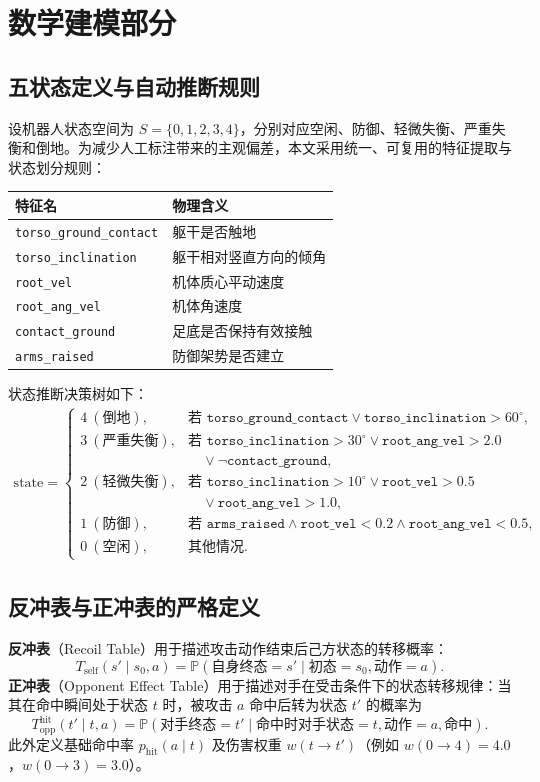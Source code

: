 \section{数学建模部分}
\subsection{五状态定义与自动推断规则}
设机器人状态空间为 $S=\{0,1,2,3,4\}$，分别对应空闲、防御、轻微失衡、严重失衡和倒地。为减少人工标注带来的主观偏差，本文采用统一、可复用的特征提取与状态划分规则：
\begin{center}
\begin{tabular}{ll}
\toprule
特征名 & 物理含义 \\
\midrule
\texttt{torso\_ground\_contact} & 躯干是否触地 \\
\texttt{torso\_inclination} & 躯干相对竖直方向的倾角 \\
\texttt{root\_vel} & 机体质心平动速度 \\
\texttt{root\_ang\_vel} & 机体角速度 \\
\texttt{contact\_ground} & 足底是否保持有效接触 \\
\texttt{arms\_raised} & 防御架势是否建立 \\
\bottomrule
\end{tabular}
\end{center}

状态推断决策树如下：
\begin{align*}
\mathrm{state} =
\begin{cases}
4\ (\text{倒地}), & \text{若 } \texttt{torso\_ground\_contact} \lor \texttt{torso\_inclination} > 60^\circ,\\
3\ (\text{严重失衡}), & \text{若 } \texttt{torso\_inclination} > 30^\circ \lor \texttt{root\_ang\_vel} > 2.0 \\
& \quad\lor \neg\texttt{contact\_ground},\\
2\ (\text{轻微失衡}), & \text{若 } \texttt{torso\_inclination} > 10^\circ \lor \texttt{root\_vel} > 0.5 \\
& \quad\lor \texttt{root\_ang\_vel} > 1.0,\\
1\ (\text{防御}), & \text{若 } \texttt{arms\_raised} \land \texttt{root\_vel} < 0.2 \land \texttt{root\_ang\_vel} < 0.5,\\
0\ (\text{空闲}), & \text{其他情况}.
\end{cases}
\end{align*}

\subsection{反冲表与正冲表的严格定义}
\textbf{反冲表}（Recoil Table）用于描述攻击动作结束后己方状态的转移概率：
\[
T_{\text{self}}(s' \mid s_0, a) = \mathbb{P}(\text{自身终态} = s' \mid \text{初态} = s_0, \text{动作} = a).
\]
\textbf{正冲表}（Opponent Effect Table）用于描述对手在受击条件下的状态转移规律：当其在命中瞬间处于状态 $t$ 时，被攻击 $a$ 命中后转为状态 $t'$ 的概率为
\[
T_{\text{opp}}^{\text{hit}}(t' \mid t, a) = \mathbb{P}(\text{对手终态} = t' \mid \text{命中时对手状态} = t, \text{动作} = a, \text{命中}).
\]
此外定义基础命中率 $p_{\text{hit}}(a \mid t)$ 及伤害权重 $w(t \to t')$（例如 $w(0\to4)=4.0$，$w(0\to3)=3.0$）。

